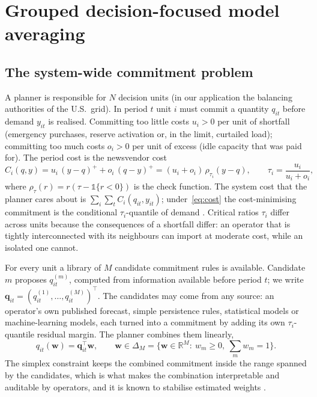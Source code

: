 \section{Grouped decision-focused model averaging}\label{sec:method}

\subsection{The system-wide commitment problem}

A planner is responsible for $N$ decision units (in our application the balancing authorities of the U.S.\ grid).
In period $t$ unit $i$ must commit a quantity $q_{it}$ before demand $y_{it}$ is realised.
Committing too little costs $u_i>0$ per unit of shortfall (emergency purchases, reserve activation or, in the limit, curtailed load); committing too much costs $o_i>0$ per unit of excess (idle capacity that was paid for).
The period cost is the newsvendor cost
\begin{equation}\label{eq:cost}
C_i(q,y)=u_i\,(y-q)^+ + o_i\,(q-y)^+ = (u_i+o_i)\,\rho_{\tau_i}(y-q),\qquad \tau_i=\frac{u_i}{u_i+o_i},
\end{equation}
where $\rho_\tau(r)=r(\tau-\mathbb 1\{r<0\})$ is the check function.
The system cost that the planner cares about is $\sum_i\sum_t C_i(q_{it},y_{it})$; under~\eqref{eq:cost} the cost-minimising commitment is the conditional $\tau_i$-quantile of demand \citep{Gneiting2011}.
Critical ratios $\tau_i$ differ across units because the consequences of a shortfall differ: an operator that is tightly interconnected with its neighbours can import at moderate cost, while an isolated one cannot.

For every unit a library of $M$ candidate commitment rules is available.
Candidate $m$ proposes $q^{(m)}_{it}$, computed from information available before period $t$; we write $\bm q_{it}=(q^{(1)}_{it},\dots,q^{(M)}_{it})^\top$.
The candidates may come from any source: an operator's own published forecast, simple persistence rules, statistical models or machine-learning models, each turned into a commitment by adding its own $\tau_i$-quantile residual margin.
The planner combines them linearly,
\[
q_{it}(\bm w)=\bm q_{it}^\top\bm w,\qquad \bm w\in\Delta_M=\Big\{\bm w\in\mathbb R^M:\ w_m\ge 0,\ \textstyle\sum_m w_m=1\Big\}.
\]
The simplex constraint keeps the combined commitment inside the range spanned by the candidates, which is what makes the combination interpretable and auditable by operators, and it is known to stabilise estimated weights \citep{Zou2025weights}.

